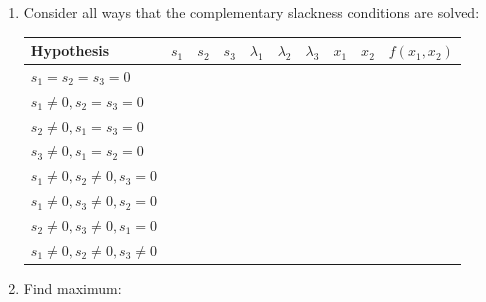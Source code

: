 \documentclass[]{book}
\theoremstyle{definition}
\theoremstyle{definition}
\theoremstyle{definition}
\theoremstyle{remark}
\begin{document}
\begin{enumerate}
\item Consider all ways that the complementary slackness conditions are solved:
\begin{center}
\begin{tabular}{|l|cccccccc|c|}
\hline
Hypothesis & $s_1$ & $s_2$ & $s_3$ & $\lambda_1$ & $\lambda_2$ & $\lambda_3$ & $x_1$ & $x_2$ & $f(x_1, x_2)$\\
\hline
$s_1 = s_2 = s_3 = 0$ & \multicolumn{8}{l|}{\phantom{No solution}} & \\
$s_1 \neq 0, s_2 = s_3 = 0$ & \phantom{2} & \phantom{0} & \phantom{0} & \phantom{0} & \phantom{0} & \phantom{0} & \phantom{0} & \phantom{0} & \phantom{0}\\
$s_2 \neq 0, s_1 = s_3 = 0$ & \phantom{0} & \phantom{2} & \phantom{0} & \phantom{-8} & \phantom{0} & \phantom{-8} & \phantom{4} & \phantom{0} & \phantom{-16}\\
$s_3 \neq 0, s_1 = s_2 = 0$ & \phantom{0} & \phantom{0} & \phantom{2} & \phantom{-16} & \phantom{-16} & \phantom{0} & \phantom{0} & \phantom{4} & \phantom{-32}\\
$s_1 \neq 0, s_2 \neq 0, s_3 = 0$ &\multicolumn{8}{l|}{\phantom{No solution}} & \\
$s_1 \neq 0, s_3 \neq 0, s_2 = 0$ &\multicolumn{8}{l|}{\phantom{No solution}} & \\
$s_2 \neq 0, s_3 \neq 0, s_1 = 0$ &\phantom{0} & \phantom{$\sqrt{\frac{8}{3}}$} & \phantom{$\sqrt{\frac{4}{3}}$} & \phantom{$-\frac{16}{3}$} & \phantom{0} & \phantom{0} & \phantom{$\frac{8}{3}$}& \phantom{$\frac{4}{3}$} & \phantom{$-\frac{32}{3}$}\\
$s_1 \neq 0, s_2 \neq 0, s_3 \neq 0$ &\multicolumn{8}{l|}{\phantom{No solution}}& \\
\hline
\end{tabular}
\end{center}


\item  Find maximum: \phantom{Looking at the values of $f(x_1,x_2)$ at the critical points, we see that the constrained maximum is located at $(x_1, x_2) = (0,0)$, which is the same as the unconstrained max.  The constrained minimum is located at $(x_1, x_2) = (0,4)$, while there is no unconstrained minimum for this problem.}

\end{enumerate}
\end{document}
